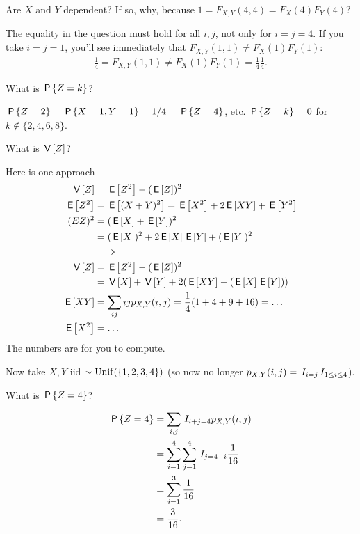\begin{exercise}
Are $X$ and $Y$ dependent?  If so, why, because $1=F_{X,Y}(4,4)= F_X(4)F_Y(4)$?
\begin{solution}
  The equality in the question must hold for all $i,j$, not only for $i=j=4$.
  If you take $i=j=1$, you'll see immediately that $F_{X,Y}(1,1)\neq F_X(1)F_Y(1)$:
  \begin{align}
    \label{eq:23}
    \frac{1}{4} = F_{X,Y}(1,1) \neq F_{X}(1) F_Y(1) = \frac{1}{4}\frac{1}{4}.
  \end{align}
\end{solution}
\end{exercise}

\begin{exercise}
What is $\P{Z=k}$?
\begin{solution}
$\P{Z=2} = \P{X=1, Y=1} = 1/4 = \P{Z=4}$, etc.
$\P{Z=k} = 0$ for $k\not \in \{2, 4, 6, 8\}$.
\end{solution}
\end{exercise}


\begin{exercise}
What is $\V Z$?
\begin{solution}
Here is one approach
\begin{align}
\label{eq:3}
\V Z &= \E{Z^2} - (\E Z)^{2}\\
\E{Z^2} &= \E{(X+Y)^{2}} = \E{X^{2}} + 2\E{XY} + \E{Y^{2}} \\
(E{Z})^{2} &= (\E X + \E Y)^{2} \\
 &= (\E X)^2 + 2\E X \E Y + (\E Y)^{2} \\
&\implies \\
\V Z &= \E{Z^2} - (\E Z)^{2}\\
 &= \V X + \V Y + 2 (\E{XY} - (\E X \E Y))\\
\E{XY} &= \sum_{ij} ijp_{X,Y}(i,j) = \frac 1 4 (1 + 4 + 9 + 16) = \ldots \\
\E{X^{2}} &= \ldots
\end{align}
The numbers are for you to compute.
\end{solution}
\end{exercise}

Now take $X, Y$ iid $\sim\Unif{\{1,2,3,4\}}$ (so now no longer $p_{X,Y}(i,j) = \1{i=j}\1{1\leq i \leq 4}$).

\begin{exercise}
What is $\P{Z=4}$?
\begin{solution}
\begin{align}
\label{eq:2}
\P{Z=4}
&= \sum_{i, j} \1{i+j=4} p_{X,Y}(i,j) \\
&= \sum_{i=1}^4 \sum_{j=1}^{4} \1{j=4-i} \frac{1}{16} \\
&= \sum_{i=1}^3  \frac{1}{16} \\
&= \frac{3}{16}.
\end{align}
\end{solution}
\end{exercise}

